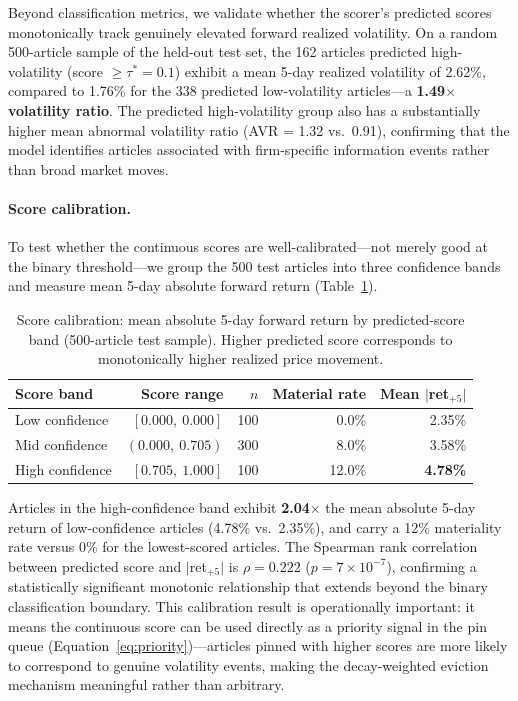 \documentclass{article}
\begin{document}
Beyond classification metrics, we validate whether the scorer's predicted scores monotonically track genuinely elevated forward realized volatility.
On a random 500-article sample of the held-out test set, the 162 articles predicted high-volatility (score $\geq \tau^* = 0.1$) exhibit a mean 5-day realized volatility of 2.62\%, compared to 1.76\% for the 338 predicted low-volatility articles---a \textbf{1.49$\times$ volatility ratio}.
The predicted high-volatility group also has a substantially higher mean abnormal volatility ratio (AVR = 1.32 vs.\ 0.91), confirming that the model identifies articles associated with firm-specific information events rather than broad market moves.

\paragraph{Score calibration.}
To test whether the continuous scores are well-calibrated---not merely good at the binary threshold---we group the 500 test articles into three confidence bands and measure mean 5-day absolute forward return (Table~\ref{tab:calibration}).

\begin{table}[h]
\centering
\caption{Score calibration: mean absolute 5-day forward return by predicted-score band (500-article test sample). Higher predicted score corresponds to monotonically higher realized price movement.}
\label{tab:calibration}
\small
\begin{tabular}{@{}lrrrr@{}}
\toprule
\textbf{Score band} & \textbf{Score range} & \textbf{$n$} & \textbf{Material rate} & \textbf{Mean $|$ret$_{+5}|$} \\
\midrule
Low confidence   & $[0.000,\ 0.000]$ & 100 & 0.0\%  & 2.35\% \\
Mid confidence   & $(0.000,\ 0.705)$ & 300 & 8.0\%  & 3.58\% \\
High confidence  & $[0.705,\ 1.000]$ & 100 & 12.0\% & \textbf{4.78\%} \\
\bottomrule
\end{tabular}
\end{table}

Articles in the high-confidence band exhibit \textbf{2.04$\times$} the mean absolute 5-day return of low-confidence articles (4.78\% vs.\ 2.35\%), and carry a 12\% materiality rate versus 0\% for the lowest-scored articles.
The Spearman rank correlation between predicted score and $|$ret$_{+5}|$ is $\rho = 0.222$ ($p = 7 \times 10^{-7}$), confirming a statistically significant monotonic relationship that extends beyond the binary classification boundary.
This calibration result is operationally important: it means the continuous score can be used directly as a priority signal in the pin queue (Equation~\eqref{eq:priority})---articles pinned with higher scores are more likely to correspond to genuine volatility events, making the decay-weighted eviction mechanism meaningful rather than arbitrary.
\end{document}
